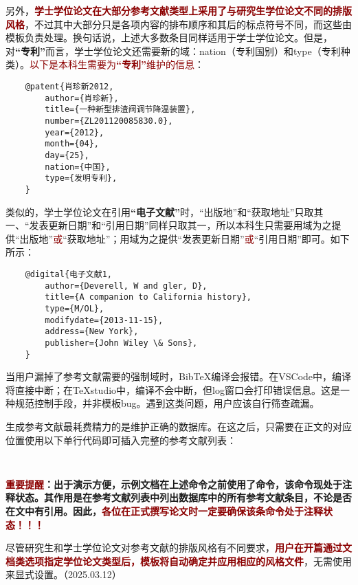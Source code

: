 \documentclass[doctor, vlined]{DissertUESTC}
\begin{document}
	另外，\textbf{\textcolor{DarkRed}{学士学位论文在大部分参考文献类型上采用了与研究生学位论文不同的排版风格}}，不过其中大部分只是各项内容的排布顺序和其后的标点符号不同，而这些由模板负责处理。换句话说，上述大多数条目同样适用于学士学位论文。但是，对\textbf{“专利”}而言，学士学位论文还需要新的域：nation（专利国别）和type（专利种类）。\textcolor{DarkRed}{以下是本科生需要为\textbf{“专利”}维护的信息}：
	\begin{verbatim}
	@patent{肖珍新2012,
	    author={肖珍新},
	    title={一种新型排渣阀调节降温装置},
	    number={ZL201120085830.0},
	    year={2012},
	    month={04},
	    day={25},
	    nation={中国},
	    type={发明专利},
	}
	\end{verbatim}

	类似的，学士学位论文在引用\textbf{“电子文献”}时，“出版地”和“获取地址”只取其一、“发表更新日期”和“引用日期”同样只取其一，所以本科生只需要用域为之提供“出版地”\textcolor{DarkRed}{或}“获取地址”；用域为之提供“发表更新日期”\textcolor{DarkRed}{或}“引用日期”即可。如下所示：
	\begin{verbatim}
	@digital{电子文献1,
	    author={Deverell, W and gler, D},
	    title={A companion to California history},
	    type={M/OL},
	    modifydate={2013-11-15},
	    address={New York},
	    publisher={John Wiley \& Sons},
	}
	\end{verbatim}

	

	当用户漏掉了参考文献需要的强制域时，BibTeX编译会报错。在VSCode中，编译将直接中断；在TeXstudio中，编译不会中断，但log窗口会打印错误信息。这是一种规范控制手段，并非模板bug。遇到这类问题，用户应该自行筛查疏漏。
	
	生成参考文献最耗费精力的是维护正确的数据库。在这之后，只需要在正文的对应位置使用以下单行代码即可插入完整的参考文献列表：
	\begin{verbatim}
		
	\end{verbatim}
	
	\textbf{\textcolor{DarkRed}{重要提醒}：出于演示方便，示例文档在上述命令之前使用了命令，该命令现处于注释状态。其作用是在参考文献列表中列出数据库中的所有参考文献条目，不论是否在文中有引用。因此，\textcolor{DarkRed}{各位在正式撰写论文时一定要确保该条命令处于注释状态！！！}}
	
	尽管研究生和学士学位论文对参考文献的排版风格有不同要求，\textbf{\textcolor{DarkRed}{用户在开篇通过文档类选项指定学位论文类型后，模板将自动确定并应用相应的风格文件}}，无需使用来显式设置。（2025.03.12）
	
\end{document}
